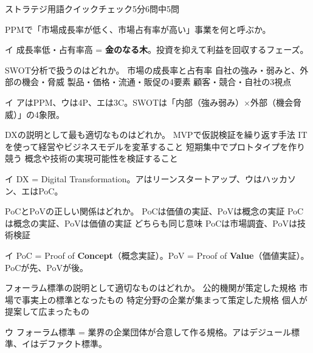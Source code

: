 \begin{timeattack}{ストラテジ用語クイックチェック}{5分}{6問中5問}

\begin{itpmon}[\diffbadge{基}]{PPMで「市場成長率が低く、市場占有率が高い」事業を何と呼ぶか。}
\end{itpmon}
\begin{kaisetsu}{イ}
成長率低・占有率高 = \textbf{金のなる木}。投資を抑えて利益を回収するフェーズ。
\end{kaisetsu}

\begin{itpmon}[\diffbadge{基}]{SWOT分析で扱うのはどれか。}
\sentakushi
  {市場の成長率と占有率}
  {自社の強み・弱みと、外部の機会・脅威}
  {製品・価格・流通・販促の4要素}
  {顧客・競合・自社の3視点}
\end{itpmon}
\begin{kaisetsu}{イ}
アはPPM、ウは4P、エは3C。SWOTは「内部（強み弱み）×外部（機会脅威）」の4象限。
\end{kaisetsu}

\begin{itpmon}[\diffbadge{基}]{DXの説明として最も適切なものはどれか。}
\sentakushi
  {MVPで仮説検証を繰り返す手法}
  {ITを使って経営やビジネスモデルを変革すること}
  {短期集中でプロトタイプを作り競う}
  {概念や技術の実現可能性を検証すること}
\end{itpmon}
\begin{kaisetsu}{イ}
DX = Digital Transformation。アはリーンスタートアップ、ウはハッカソン、エはPoC。
\end{kaisetsu}

\begin{itpmon}[\diffbadge{基}]{PoCとPoVの正しい関係はどれか。}
\sentakushi
  {PoCは価値の実証、PoVは概念の実証}
  {PoCは概念の実証、PoVは価値の実証}
  {どちらも同じ意味}
  {PoCは市場調査、PoVは技術検証}
\end{itpmon}
\begin{kaisetsu}{イ}
PoC = Proof of \textbf{Concept}（概念実証）。PoV = Proof of \textbf{Value}（価値実証）。PoCが先、PoVが後。
\end{kaisetsu}

\begin{itpmon}[\diffbadge{標}]{フォーラム標準の説明として適切なものはどれか。}
\sentakushi
  {公的機関が策定した規格}
  {市場で事実上の標準となったもの}
  {特定分野の企業が集まって策定した規格}
  {個人が提案して広まったもの}
\end{itpmon}
\begin{kaisetsu}{ウ}
フォーラム標準 = 業界の企業団体が合意して作る規格。アはデジュール標準、イはデファクト標準。
\end{kaisetsu}


\end{timeattack}
